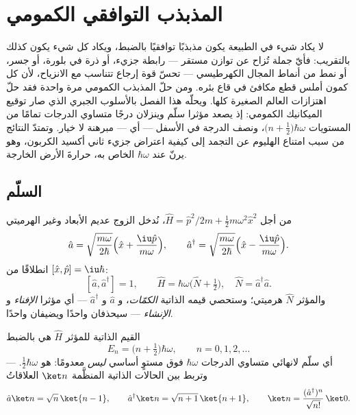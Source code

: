 \chapter{المذبذب التوافقي الكمومي}\label{ch:b3:harmonic-oscillator}

لا يكاد شيء في الطبيعة يكون مذبذبًا توافقيًا بالضبط، ويكاد كل
شيء يكون كذلك بالتقريب: فأيّ جملة تُزاح عن توازن مستقر ---
رابطة جزيء، أو ذرة في بلورة، أو جسر، أو نمط من أنماط المجال
الكهرطيسي --- تحسّ قوة إرجاع تتناسب مع الانزياح، لأن كل كمون
أملس قطع مكافئ في قاع بئره. ومن حلّ المذبذب الكمومي مرة واحدة
فقد حلّ اهتزازات العالم الصغيرة كلها. ويحلّه هذا الفصل بالأسلوب
الجبري الذي صار توقيع الميكانيك الكمومي: إذ يصعد مؤثرا سلّم
وينزلان درجًا متساوي الدرجات تمامًا من المستويات $\big(n +
\tfrac12\big)\hbar\omega$، ونصف الدرجة في الأسفل --- أي
 --- مبرهنة لا خيار. وتمتدّ
النتائج من سبب امتناع الهليوم عن التجمد إلى كيفية اعتراض جزيء
ثاني أكسيد الكربون، وهو يرنّ عند $\hbar\omega$ الخاص به، حرارةَ
الأرض الخارجة.

\section{السلّم}

\begin{definition}\label{def:b3:harmonic-oscillator:ladder}
من أجل $\hat H = \hat p^2/2m + \tfrac12 m\omega^2\hat x^2$، نُدخل
الزوج عديم الأبعاد وغير الهرميتي
\[
\hat a = \sqrt{\frac{m\omega}{2\hbar}}\Big(\hat x +
\frac{\iu\hat p}{m\omega}\Big) , \qquad
\hat a^\dagger = \sqrt{\frac{m\omega}{2\hbar}}\Big(\hat x -
\frac{\iu\hat p}{m\omega}\Big) .
\]
انطلاقًا من $[\hat x, \hat p] = \iu\hbar$:
\[
[\hat a, \hat a^\dagger] = 1 , \qquad
\hat H = \hbar\omega\Big(\hat N + \tfrac12\Big) , \quad
\hat N = \hat a^\dagger\hat a .
\]
والمؤثر $\hat N$ هرميتي؛ وستحصي قيمه الذاتية \emph{الكمّات}، و
$\hat a$ و $\hat a^\dagger$ --- أي مؤثرا \emph{الإفناء} و
\emph{الإنشاء} --- سيحذفان واحدًا ويضيفان واحدًا.
\end{definition}

\begin{theorem}\label{thm:b3:harmonic-oscillator:spectrum}
القيم الذاتية للمؤثر $\hat H$ هي بالضبط
\[
E_n = \Big(n + \tfrac12\Big)\hbar\omega , \qquad n = 0, 1, 2, \dots
\]
--- أي سلّم لانهائي متساوي الدرجات $\hbar\omega$ فوق مستوٍ
أساسي \emph{ليس} معدومًا: هو \emph{}
$\tfrac12\hbar\omega$. وتربط بين الحالات الذاتية المنظَّمة $\ket n$
العلاقاتُ
\[
\hat a\ket n = \sqrt n\,\ket{n - 1} , \qquad
\hat a^\dagger\ket n = \sqrt{n + 1}\,\ket{n + 1} ,
\qquad
\ket n = \frac{(\hat a^\dagger)^n}{\sqrt{n!}}\,\ket0 .
\]
\end{theorem}


